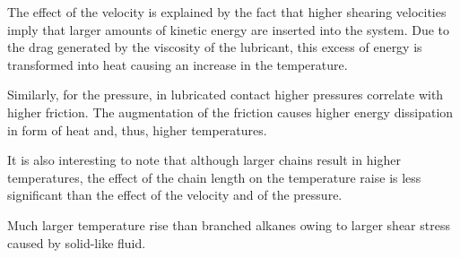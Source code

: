 \documentclass[aps,prb,reprint,superscriptaddress, a4paper]{revtex4-1}
\begin{document}
The effect of the velocity is explained by the fact that higher shearing velocities imply that larger amounts of kinetic energy are inserted into the system. Due to the drag generated by the viscosity of the lubricant, this excess of  energy is transformed into heat causing an increase in the temperature. 

Similarly, for the pressure, in lubricated contact higher pressures correlate with higher friction. The augmentation of the friction causes higher energy dissipation in form of heat and, thus, higher temperatures. 

It is also interesting to note that although larger chains result in higher temperatures, the effect of the chain length on the temperature raise is less significant than the effect of the velocity and of the pressure. 

Much larger temperature rise than branched alkanes\cite{Ewen2017a} owing to larger shear stress caused by solid-like fluid.
\end{document}
